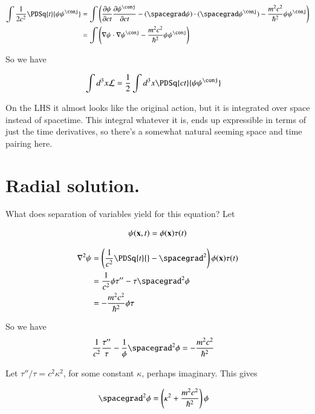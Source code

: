 \begin{align*}
\int \inv{2 c^2} \PDSq{t}{\psi\psi^\conj}
&=
\int
\left(
\PD{ct}{\psi}\PD{ct}{\psi^\conj}
- (\spacegrad \psi) \cdot (\spacegrad \psi^\conj)
- \frac{m^2 c^2}{\hbar^2} \psi \psi^\conj
\right)
\\
&=
\int
\left(
\grad \psi \cdot \grad \psi^\conj
- \frac{m^2 c^2}{\hbar^2} \psi \psi^\conj
\right)
\\
\end{align*}

So we have

\begin{align*}
\int d^3 x \LL &= \inv{2} \int d^3 x \PDSq{ct}{\psi\psi^\conj}
\end{align*}

On the LHS it almost looks like the original action, but it is integrated over space instead of spacetime.  This integral
whatever it is, ends up expressible in terms of just the time derivatives, so there's a somewhat natural seeming space and time
pairing here.

\section{Radial solution. }

What does separation of variables yield for this equation?  Let

\begin{align*}
\psi(\mathbf{x},t) = \phi(\mathbf{x})\tau(t)
\end{align*}

\begin{align*}
\grad^2 \psi
&= \left(\inv{c^2} \PDSq{t}{} - \spacegrad^2 \right) \phi(\Bx)\tau(t) \\
&= \inv{c^2} \phi\tau'' - \tau \spacegrad^2 \phi \\
&= -\frac{m^2 c^2}{\hbar^2}\phi\tau
\end{align*}

So we have
\begin{align*}
\inv{c^2} \frac{\tau''}{\tau} - \inv{\phi} \spacegrad^2 \phi &= -\frac{m^2 c^2}{\hbar^2}
\end{align*}

Let $\tau''/\tau = c^2 \kappa^2$, for some constant $\kappa$, perhaps imaginary. This gives

\begin{align*}
\spacegrad^2 \phi &= \left( \kappa^2 + \frac{m^2 c^2}{\hbar^2} \right) \phi
\end{align*}

